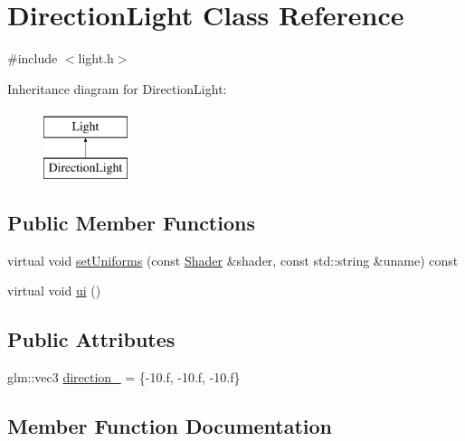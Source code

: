 \hypertarget{classDirectionLight}{}\section{Direction\+Light Class Reference}
\label{classDirectionLight}


{\ttfamily \#include $<$light.\+h$>$}

Inheritance diagram for Direction\+Light\+:\begin{figure}[H]
\begin{center}
\leavevmode
\includegraphics[height=2.000000cm]{classDirectionLight}
\end{center}
\end{figure}
\subsection*{Public Member Functions}
\begin{DoxyCompactItemize}
\item 
virtual void \hyperlink{classDirectionLight_ab10f7b680a8245bd4db3b7340593e485}{set\+Uniforms} (const \hyperlink{classShader}{Shader} \&shader, const std\+::string \&uname) const
\item 
virtual void \hyperlink{classDirectionLight_a85ac86467a3053dea596b0ebf362b68f}{ui} ()
\end{DoxyCompactItemize}
\subsection*{Public Attributes}
\begin{DoxyCompactItemize}
\item 
glm\+::vec3 \hyperlink{classDirectionLight_a838d158caa1ed127775a915ff4506861}{direction\+\_\+} = \{-\/10.f, -\/10.f, -\/10.f\}
\end{DoxyCompactItemize}


\subsection{Member Function Documentation}
\mbox{\label{classDirectionLight_ab10f7b680a8245bd4db3b7340593e485}} 
